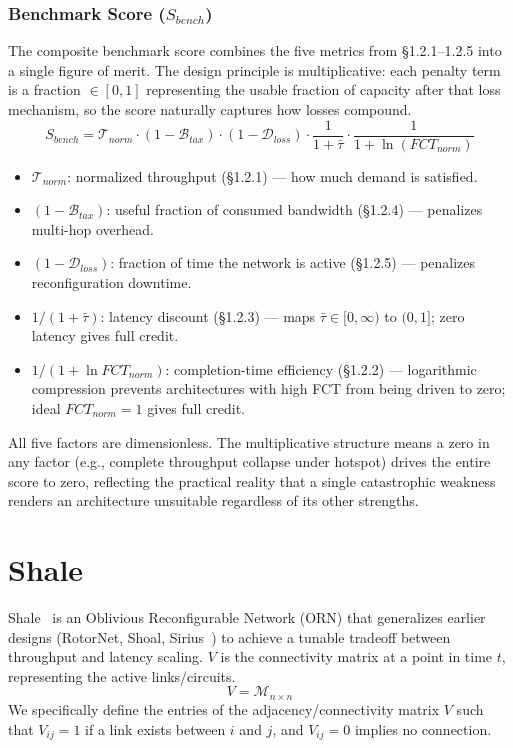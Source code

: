 \documentclass{article}
\begin{document}
    \subsubsection{Benchmark Score ($S_{bench}$)}
    The composite benchmark score combines the five metrics from \S1.2.1--1.2.5 into a single figure of merit. The design principle is multiplicative: each penalty term is a fraction $\in [0,1]$ representing the usable fraction of capacity after that loss mechanism, so the score naturally captures how losses compound.
    \begin{equation}
        S_{bench} = \mathcal{T}_{norm} \cdot (1 - \mathcal{B}_{tax}) \cdot (1 - \mathcal{D}_{loss}) \cdot \frac{1}{1 + \bar{\tau}} \cdot \frac{1}{1 + \ln(FCT_{norm})}
    \end{equation}
    \begin{itemize}
        \item $\mathcal{T}_{norm}$: normalized throughput (\S1.2.1) --- how much demand is satisfied.
        \item $(1 - \mathcal{B}_{tax})$: useful fraction of consumed bandwidth (\S1.2.4) --- penalizes multi-hop overhead.
        \item $(1 - \mathcal{D}_{loss})$: fraction of time the network is active (\S1.2.5) --- penalizes reconfiguration downtime.
        \item $1/(1 + \bar{\tau})$: latency discount (\S1.2.3) --- maps $\bar{\tau} \in [0, \infty)$ to $(0, 1]$; zero latency gives full credit.
        \item $1/(1 + \ln FCT_{norm})$: completion-time efficiency (\S1.2.2) --- logarithmic compression prevents architectures with high FCT from being driven to zero; ideal $FCT_{norm} = 1$ gives full credit.
    \end{itemize}
    All five factors are dimensionless. The multiplicative structure means a zero in any factor (e.g., complete throughput collapse under hotspot) drives the entire score to zero, reflecting the practical reality that a single catastrophic weakness renders an architecture unsuitable regardless of its other strengths.
    \section{Shale}
    Shale~\cite{shale} is an Oblivious Reconfigurable Network (ORN) that generalizes earlier designs (RotorNet, Shoal, Sirius~\cite{sirius}) to achieve a tunable tradeoff between throughput and latency scaling. $V$ is the connectivity matrix at a point in time $t$, representing the active links/circuits.
    \[
        V = \mathscr{M}_{n \times n}
    \]
    We specifically define the entries of the adjacency/connectivity matrix $V$ such that $V_{ij} = 1$ if a link exists between $i$ and $j$, and $V_{ij} = 0$ implies no connection.
    
\end{document}
